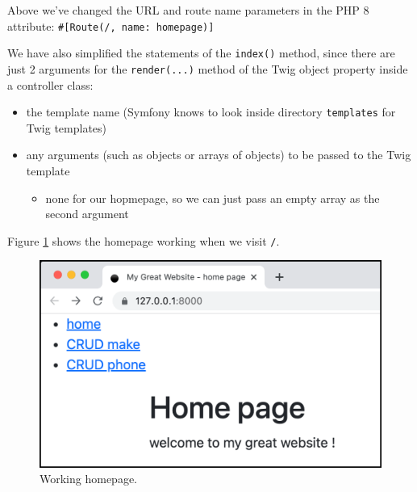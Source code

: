 \documentclass[a4paperpaper,openright]{book}
\newenvironment{Shaded}{}{}
\newcommand{\CommentTok}[1]{\textcolor[rgb]{0.38,0.63,0.69}{\textit{#1}}}
\newcommand{\KeywordTok}[1]{\textcolor[rgb]{0.00,0.44,0.13}{\textbf{#1}}}
\newcommand{\NormalTok}[1]{#1}
\newcommand{\OtherTok}[1]{\textcolor[rgb]{0.00,0.44,0.13}{#1}}
\newcommand{\StringTok}[1]{\textcolor[rgb]{0.25,0.44,0.63}{#1}}
\providecommand{\tightlist}{%
  \setlength{\itemsep}{0pt}\setlength{\parskip}{0pt}}
\begin{document}
\begin{Shaded}
\end{Shaded}

Above we've changed the URL and route name parameters in the PHP 8
attribute:
\texttt{\#{[}Route(\textquotesingle{}/\textquotesingle{},\ name:\ \textquotesingle{}homepage\textquotesingle{}){]}}

We have also simplified the statements of the \texttt{index()} method,
since there are just 2 arguments for the \texttt{render(...)} method of
the Twig object property inside a controller class:

\begin{itemize}
\item
  the template name (Symfony knows to look inside directory
  \texttt{templates} for Twig templates)
\item
  any arguments (such as objects or arrays of objects) to be passed to
  the Twig template

  \begin{itemize}
  \tightlist
  \item
    none for our hopmepage, so we can just pass an empty array as the
    second argument
  \end{itemize}
\end{itemize}

Figure \ref{homepage_screenshot} shows the homepage working when we
visit \texttt{/}.

\begin{figure}
\centering
\includegraphics[width=1\textwidth,height=\textheight]{./tex2pdf.-564b08cce17d66dc/3e33bd66d4293d128ccf182d28e9d7a2e65f421a.png}
\caption{Working homepage.\label{homepage_screenshot}}
\end{figure}
\end{document}
